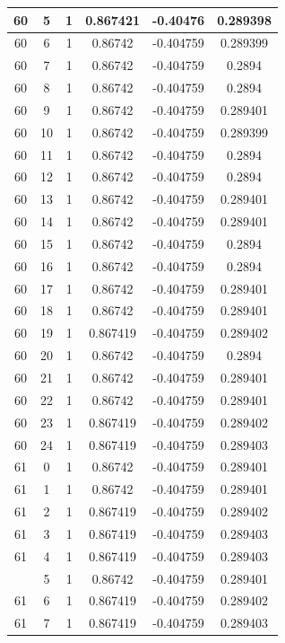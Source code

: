 \documentclass[12pt,a4paper]{article}
\numberwithin{equation}{section}
\numberwithin{figure}{section}
\numberwithin{table}{section}
\begin{document}
\begin{longtable}{|c|c|c|c|c|c|}
60 & 5 & 1 & 0.867421 & -0.40476 & 0.289398 \\ \hline
60 & 6 & 1 & 0.86742 & -0.404759 & 0.289399 \\ \hline
60 & 7 & 1 & 0.86742 & -0.404759 & 0.2894 \\ \hline
60 & 8 & 1 & 0.86742 & -0.404759 & 0.2894 \\ \hline
60 & 9 & 1 & 0.86742 & -0.404759 & 0.289401 \\ \hline
60 & 10 & 1 & 0.86742 & -0.404759 & 0.289399 \\ \hline
60 & 11 & 1 & 0.86742 & -0.404759 & 0.2894 \\ \hline
60 & 12 & 1 & 0.86742 & -0.404759 & 0.2894 \\ \hline
60 & 13 & 1 & 0.86742 & -0.404759 & 0.289401 \\ \hline
60 & 14 & 1 & 0.86742 & -0.404759 & 0.289401 \\ \hline
60 & 15 & 1 & 0.86742 & -0.404759 & 0.2894 \\ \hline
60 & 16 & 1 & 0.86742 & -0.404759 & 0.2894 \\ \hline
60 & 17 & 1 & 0.86742 & -0.404759 & 0.289401 \\ \hline
60 & 18 & 1 & 0.86742 & -0.404759 & 0.289401 \\ \hline
60 & 19 & 1 & 0.867419 & -0.404759 & 0.289402 \\ \hline
60 & 20 & 1 & 0.86742 & -0.404759 & 0.2894 \\ \hline
60 & 21 & 1 & 0.86742 & -0.404759 & 0.289401 \\ \hline
60 & 22 & 1 & 0.86742 & -0.404759 & 0.289401 \\ \hline
60 & 23 & 1 & 0.867419 & -0.404759 & 0.289402 \\ \hline
60 & 24 & 1 & 0.867419 & -0.404759 & 0.289403 \\ \hline
61 & 0 & 1 & 0.86742 & -0.404759 & 0.289401 \\ \hline
61 & 1 & 1 & 0.86742 & -0.404759 & 0.289401 \\ \hline
61 & 2 & 1 & 0.867419 & -0.404759 & 0.289402 \\ \hline
61 & 3 & 1 & 0.867419 & -0.404759 & 0.289403 \\ \hline
61 & 4 & 1 & 0.867419 & -0.404759 & 0.289403 \\ \hline
\pagebreak
61 & 5 & 1 & 0.86742 & -0.404759 & 0.289401 \\ \hline
61 & 6 & 1 & 0.867419 & -0.404759 & 0.289402 \\ \hline
61 & 7 & 1 & 0.867419 & -0.404759 & 0.289403 \\ \hline

\end{longtable}
\end{document}
